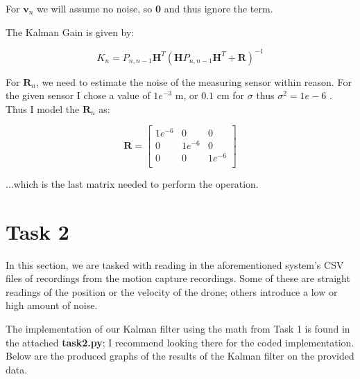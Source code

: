 \documentclass{article}
\begin{document}
For $\textbf{v}_n$ we will assume no noise, so \textbf{0} and thus ignore the term.

The Kalman Gain is given by:

\begin{equation}
    K_n = P_{n,n-1} \textbf{H}^T (\textbf{H} P_{n,n-1} \textbf{H}^T + \textbf{R})^{-1}
\end{equation}

For $\textbf{R}_n$, we need to estimate the noise of the measuring sensor within reason. For the given sensor I chose a value of $1e^{-3}$ m, or $0.1$ cm for $\sigma$ thus $\sigma^2 = 1e-6$ . Thus I model the $\textbf{R}_n$ as:

\begin{equation}
    \textbf{R} = \begin{bmatrix}
        1e^{-6} & 0       & 0       \\
        0       & 1e^{-6} & 0       \\
        0       & 0       & 1e^{-6} \\
    \end{bmatrix}
\end{equation}


...which is the last matrix needed to perform the operation.


\section*{Task 2}

In this section, we are tasked with reading in the aforementioned system's CSV files of recordings from the motion capture recordings. Some of these are straight readings of the position or the velocity of the drone; others introduce a low or high amount of noise.

The implementation of our Kalman filter using the math from Task 1 is found in the attached \textbf{task2.py}; I recommend looking there for the coded implementation. Below are the produced graphs of the results of the Kalman filter on the provided data.
\end{document}
